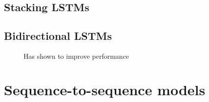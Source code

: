 \documentclass[11pt]{article}
\begin{document}
\subsection{Stacking LSTMs}

\begin{figure}[H]
    \centering
\end{figure}

\subsection{Bidirectional LSTMs}

\begin{figure}[H]
    \centering
    \caption*{Has shown to improve performance}
\end{figure}

\section{Sequence-to-sequence models}

\begin{figure}[H]
    \centering
\end{figure}
\end{document}
